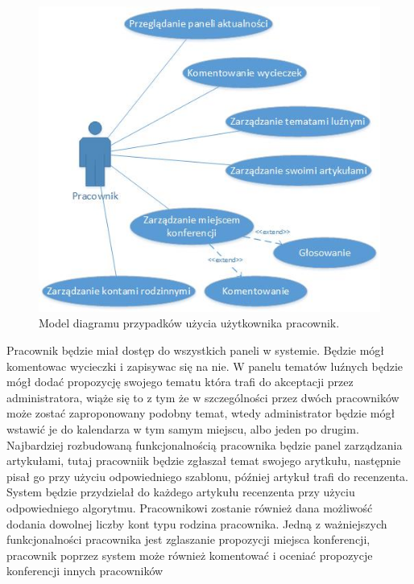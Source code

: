 \begin{figure}[!tb]
    \centering
    \includegraphics{pracownik.jpg}
    \caption{Model diagramu przypadków użycia użytkownika pracownik.}
    \label{fig:pracownik}
\end{figure}

Pracownik będzie miał dostęp do wszystkich paneli w systemie. Będzie mógł komentowac wycieczki i zapisywac się na nie. \newline
W panelu tematów luźnych będzie mógł dodać propozycję swojego tematu która trafi do akceptacji przez administratora, wiąże się to z tym że w szczególności przez dwóch pracowników może zostać zaproponowany podobny temat, wtedy administrator będzie mógł wstawić je do kalendarza w tym samym miejscu, albo jeden po drugim. \newline
Najbardziej rozbudowaną funkcjonalnością pracownika będzie panel zarządzania artykułami, tutaj pracowniik będzie zgłaszał temat swojego arytkułu, następnie pisał go przy użyciu odpowiedniego szablonu, później artykuł trafi do recenzenta. System będzie przydzielał do każdego artykułu recenzenta przy użyciu odpowiedniego algorytmu. \newline
Pracownikowi zostanie również dana możliwość dodania dowolnej liczby kont typu rodzina pracownika. \newline
Jedną z ważniejszych funkcjonalności pracownika jest zglaszanie propozycji miejsca konferencji, pracownik poprzez system może również komentować i oceniać propozycje konferencji innych pracowników

